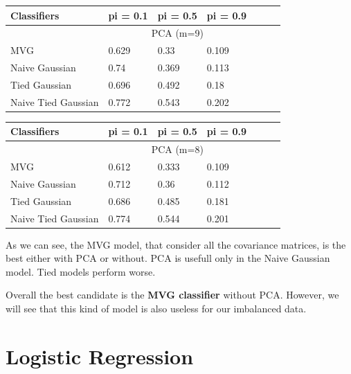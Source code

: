 \documentclass[english]{report}
\begin{document}
\begin{table}[H]
    \centering
    \begin{tabular}{@{}lllllll@{}}
    \toprule
    Classifiers         & pi = 0.1 & pi = 0.5 & pi = 0.9 \\ \midrule
                        & \multicolumn{3}{c}{PCA (m=9)}  \\ \midrule
    MVG                 & 0.629    & 0.33    & 0.109    \\
    Naive Gaussian      & 0.74    & 0.369    & 0.113    \\
    Tied Gaussian       & 0.696    & 0.492    & 0.18    \\
    Naive Tied Gaussian & 0.772    & 0.543    & 0.202    \\ \bottomrule
    \end{tabular}\label{tab:table2}
\end{table}

\begin{table}[H]
    \centering
    \begin{tabular}{@{}lllllll@{}}
    \toprule
    Classifiers         & pi = 0.1 & pi = 0.5 & pi = 0.9 \\ \midrule
                        & \multicolumn{3}{c}{PCA (m=8)}  \\ \midrule
    MVG                 & 0.612    & 0.333    & 0.109    \\
    Naive Gaussian      & 0.712     & 0.36    & 0.112    \\
    Tied Gaussian       & 0.686    & 0.485    & 0.181    \\
    Naive Tied Gaussian & 0.774    & 0.544    & 0.201    \\ \bottomrule
    \end{tabular}\label{tab:table3}
\end{table}

As we can see, the MVG model, that consider all the covariance matrices, is the best either with PCA or without.
PCA is usefull only in the Naive Gaussian model. Tied models perform worse.

Overall the best candidate is the \textbf{MVG classifier} without PCA. However, we will see that this kind of model is also
useless for our imbalanced data.

\clearpage

\section{Logistic Regression}
\end{document}
